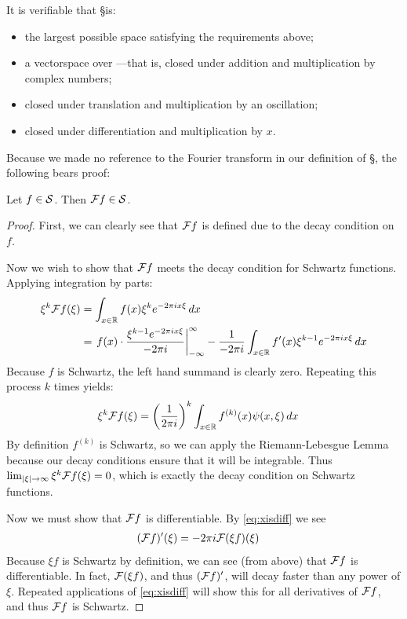       It is verifiable that \S is:
      \begin{itemize}
        \item the largest possible space satisfying the requirements above;
        \item a vectorspace over \C---that is, closed under addition and multiplication by complex numbers;
        \item closed under translation and multiplication by an oscillation;
        \item closed under differentiation and multiplication by $x$.
      \end{itemize}

      Because we made no reference to the Fourier transform in our definition of \S, the following bears proof:

      \begin{lemma}
        \label{lemma:sclosed}
        Let $f\in\S$.
        Then $\F f\in\S$.
        \begin{proof}
          First, we can clearly see that $\F f$ is defined due to the decay condition on $f$.

          Now we wish to show that $\F f$ meets the decay condition for Schwartz functions.
          Applying integration by parts:
          \begin{align*}
            \xi^k\F f(\xi) &= \int_{x\in\R} f(x)\xi^ke^{-2\pi ix\xi}\,dx\\
            &= \left.f(x)\cdot\frac{\xi^{k-1}e^{-2\pi i x\xi}}{-2\pi i}\right|_{-\infty}^\infty - \frac{1}{-2\pi i}\int_{x\in\R} f'(x)\xi^{k-1}e^{-2\pi ix\xi}\,dx
          \end{align*}
          Because $f$ is Schwartz, the left hand summand is clearly zero.
          Repeating this process $k$ times yields:
          \begin{align*}
            \xi^k\F f(\xi) &= \left(\frac{1}{2\pi i}\right)^k \int_{x\in\R}f^{(k)}(x)\psi(x,\xi)\,dx
          \end{align*}
          By definition $f^{(k)}$ is Schwartz, so we can apply the Riemann-Lebesgue Lemma because our decay conditions ensure that it will be integrable.
          Thus $\lim_{|\xi|\rightarrow\infty} \xi^k\F f(\xi) = 0$, which is exactly the decay condition on Schwartz functions.

          Now we must show that $\F f$ is differentiable. 
          By \eqref{eq:xisdiff} we see
          \begin{align*}
            (\F f)'(\xi) &= -2\pi i \F(\xi f)(\xi)
          \end{align*}
          Because $\xi f$ is Schwartz by definition, we can see (from above) that $\F f$ is differentiable.
          In fact, $\F(\xi f)$, and thus $(\F f)'$, will decay faster than any power of $\xi$.
          Repeated applications of \eqref{eq:xisdiff} will show this for all derivatives of $\F f$, and thus $\F f$ is Schwartz.
        \end{proof}
      \end{lemma}
